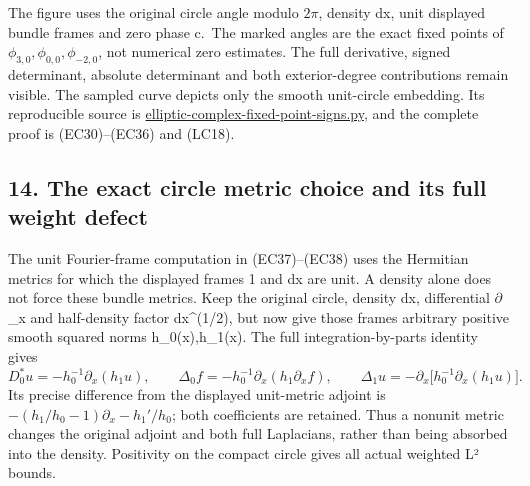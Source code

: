 \documentclass[
  11pt,
]{article}
\begin{document}
The figure uses the original circle angle modulo \(2\pi\), density dx,
unit displayed bundle frames and zero phase c.~The marked angles are the
exact fixed points of \(\phi_{3,0},\phi_{0,0},\phi_{-2,0}\), not
numerical zero estimates. The full derivative, signed determinant,
absolute determinant and both exterior-degree contributions remain
visible. The sampled curve depicts only the smooth unit-circle
embedding. Its reproducible source is
\href{../figures/elliptic-complex-fixed-point-signs.py}{elliptic-complex-fixed-point-signs.py},
and the complete proof is (EC30)--(EC36) and (LC18).

\subsection{14. The exact circle metric choice and its full weight
defect}\label{the-exact-circle-metric-choice-and-its-full-weight-defect}

The unit Fourier-frame computation in (EC37)--(EC38) uses the Hermitian
metrics for which the displayed frames 1 and dx are unit. A density
alone does not force these bundle metrics. Keep the original circle,
density dx, differential \ensuremath{\partial}\_x and half-density factor dx\^{}(1/2), but
now give those frames arbitrary positive smooth squared norms
h\_0(x),h\_1(x). The full integration-by-parts identity gives \[
D_0^*u=-h_0^{-1}\partial_x(h_1u),\qquad
\Delta_0f=-h_0^{-1}\partial_x(h_1\partial_xf),\qquad
\Delta_1u=-\partial_x\bigl[h_0^{-1}\partial_x(h_1u)\bigr].
\tag{LC19}
\] Its precise difference from the displayed unit-metric adjoint is
\(-(h_1/h_0-1)\partial_x-h_1'/h_0\); both coefficients are retained.
Thus a nonunit metric changes the original adjoint and both full
Laplacians, rather than being absorbed into the density. Positivity on
the compact circle gives all actual weighted L² bounds.
\end{document}

